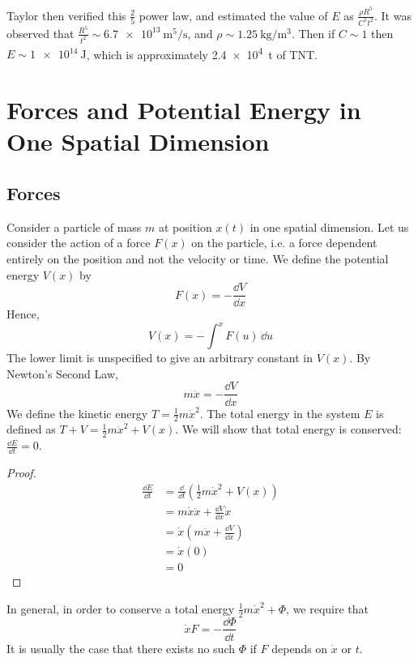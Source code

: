 \documentclass{article}
\begin{document}
Taylor then verified this $\frac{2}{5}$ power law, and estimated the value of $E$ as $\frac{\rho R^5}{C^5 t^2}$. It was observed that $\frac{R^5}{t^2} \sim \SI{6.7e13}{\metre\tothe{5}\per\second}$, and $\rho\sim\SI{1.25}{\kilogram\per\metre\cubed}$. Then if $C \sim 1$ then $E \sim \SI{1e14}{\joule}$, which is approximately \SI{2.4e4}{\tonne} of TNT.

\section{Forces and Potential Energy in One Spatial Dimension}
\subsection{Forces}
Consider a particle of mass $m$ at position $x(t)$ in one spatial dimension. Let us consider the action of a force $F(x)$ on the particle, i.e. a force dependent entirely on the position and not the velocity or time. We define the potential energy $V(x)$ by
\[ F(x) = -\frac{\dd V}{\dd x} \]
Hence,
\[ V(x) = - \int^x F(u) \,\dd u \]
The lower limit is unspecified to give an arbitrary constant in $V(x)$. By Newton's Second Law,
\[ m\ddot{x} = -\frac{\dd V}{\dd x} \]
We define the kinetic energy $T = \frac{1}{2}m\dot x^2$. The total energy in the system $E$ is defined as $T + V = \frac{1}{2} m \dot x^2 + V(x)$. We will show that total energy is conserved: $\frac{\dd E}{\dd t} = 0$.
\begin{proof}
    \begin{align*}
        \frac{\dd E}{\dd t} & = \frac{\dd}{\dd t}\left( \frac{1}{2}m\dot x^2 + V(x) \right) \\
                            & = m\dot x \ddot x + \frac{\dd V}{\dd x} \dot x                \\
                            & = \dot x\left( m \ddot x + \frac{\dd V}{\dd x} \right)        \\
                            & = \dot x ( 0 )                                                \\
                            & = 0
    \end{align*}
\end{proof}
\noindent In general, in order to conserve a total energy $\frac{1}{2}m\dot x^2 + \Phi$, we require that
\[ \dot x F = -\frac{\dd \Phi}{\dd t} \]
It is usually the case that there exists no such $\Phi$ if $F$ depends on $\dot x$ or $t$.
\end{document}
